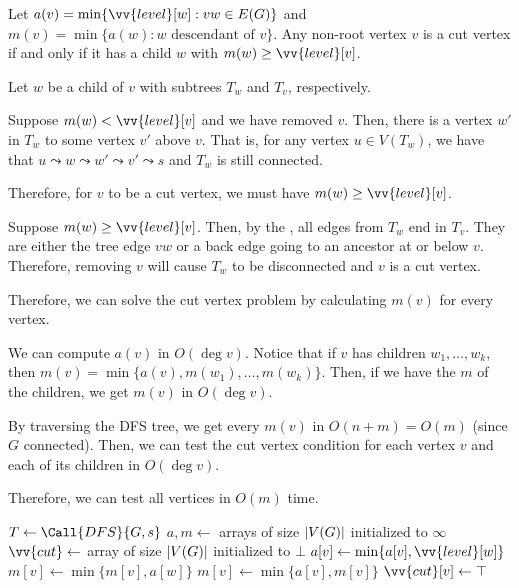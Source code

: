 \begin{prop}
  Let $a(v) = \min\{\vv{level}[w] : vw \in E(G)\}$
  and $m(v) = \min\{a(w) : \text{$w$ descendant of $v$}\}$.
  Any non-root vertex $v$ is a cut vertex if and only if
  it has a child $w$ with $m(w) \geq \vv{level}[v]$.
\end{prop}
\begin{prf}
  Let $w$ be a child of $v$ with subtrees $T_w$ and $T_v$, respectively.

  Suppose $m(w) < \vv{level}[v]$ and we have removed $v$.
  Then, there is a vertex $w'$ in $T_w$ to some vertex $v'$ above $v$.
  That is, for any vertex $u \in V(T_w)$, we have that
  $u \leadsto w \leadsto w' \leadsto v' \leadsto s$
  and $T_w$ is still connected.

  Therefore, for $v$ to be a cut vertex, we must have $m(w) \geq \vv{level}[v]$.

  Suppose $m(w) \geq \vv{level}[v]$.
  Then, by the ,
  all edges from $T_w$ end in $T_v$.
  They are either the tree edge $vw$
  or a back edge going to an ancestor at or below $v$.
  Therefore, removing $v$ will cause $T_w$ to be disconnected and $v$ is a cut vertex.
\end{prf}

Therefore, we can solve the cut vertex problem by calculating $m(v)$ for every vertex.

We can compute $a(v)$ in $O(\deg v)$.
Notice that if $v$ has children $w_1,\dotsc,w_k$,
then $m(v) = \min\{a(v), m(w_1), \dotsc, m(w_k)\}$.
Then, if we have the $m$ of the children, we get $m(v)$ in $O(\deg v)$.

By traversing the DFS tree, we get every $m(v)$ in $O(n+m) = O(m)$ (since $G$ connected).
Then, we can test the cut vertex condition for each vertex $v$
and each of its children in $O(\deg v)$.

Therefore, we can test all vertices in $O(m)$ time.

\begin{algorithm}[H]
  \caption{}
  \begin{algorithmic}[1]
    \State $T \gets \Call{DFS}{G, s}$
    \State $a, m \gets$ arrays of size $\abs{V(G)}$ initialized to $\infty$
    \State $\vv{cut} \gets$ array of size $\abs{V(G)}$ initialized to $\bot$
        \State $a[v] \gets \min\{a[v], \vv{level}[w]\}$
        \State {}
        \State $m[v] \gets \min\{m[v], a[w]\}$
      \EndFor
      \State $m[v] \gets \min\{a[v], m[v]\}$
         $\vv{cut}[v] \gets \top$ \EndIf
      \EndFor
    \EndProcedure
    \State {}
  \end{algorithmic}
\end{algorithm}

